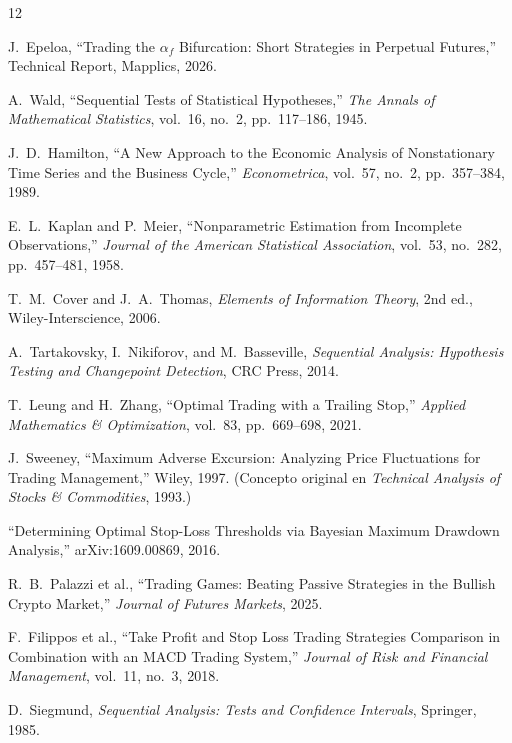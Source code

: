 \documentclass[11pt,a4paper]{article}
\begin{document}
\begin{thebibliography}{12}

J.~Epeloa,
``Trading the $\alpha_f$ Bifurcation: Short Strategies in Perpetual Futures,''
Technical Report, Mapplics, 2026.

A.~Wald,
``Sequential Tests of Statistical Hypotheses,''
\textit{The Annals of Mathematical Statistics}, vol.~16, no.~2,
pp.~117--186, 1945.

J.~D.~Hamilton,
``A New Approach to the Economic Analysis of Nonstationary Time Series
and the Business Cycle,''
\textit{Econometrica}, vol.~57, no.~2, pp.~357--384, 1989.

E.~L.~Kaplan and P.~Meier,
``Nonparametric Estimation from Incomplete Observations,''
\textit{Journal of the American Statistical Association}, vol.~53,
no.~282, pp.~457--481, 1958.

T.~M.~Cover and J.~A.~Thomas,
\textit{Elements of Information Theory}, 2nd ed.,
Wiley-Interscience, 2006.

A.~Tartakovsky, I.~Nikiforov, and M.~Basseville,
\textit{Sequential Analysis: Hypothesis Testing and Changepoint Detection},
CRC Press, 2014.

T.~Leung and H.~Zhang,
``Optimal Trading with a Trailing Stop,''
\textit{Applied Mathematics \& Optimization}, vol.~83,
pp.~669--698, 2021.

J.~Sweeney,
``Maximum Adverse Excursion: Analyzing Price Fluctuations for Trading
Management,'' Wiley, 1997.
(Concepto original en \textit{Technical Analysis of Stocks \& Commodities},
1993.)

``Determining Optimal Stop-Loss Thresholds via Bayesian Maximum
Drawdown Analysis,'' arXiv:1609.00869, 2016.

R.~B.~Palazzi et al.,
``Trading Games: Beating Passive Strategies in the Bullish Crypto Market,''
\textit{Journal of Futures Markets}, 2025.

F.~Filippos et al.,
``Take Profit and Stop Loss Trading Strategies Comparison in Combination
with an MACD Trading System,''
\textit{Journal of Risk and Financial Management}, vol.~11, no.~3, 2018.

D.~Siegmund,
\textit{Sequential Analysis: Tests and Confidence Intervals},
Springer, 1985.

\end{thebibliography}
\end{document}
